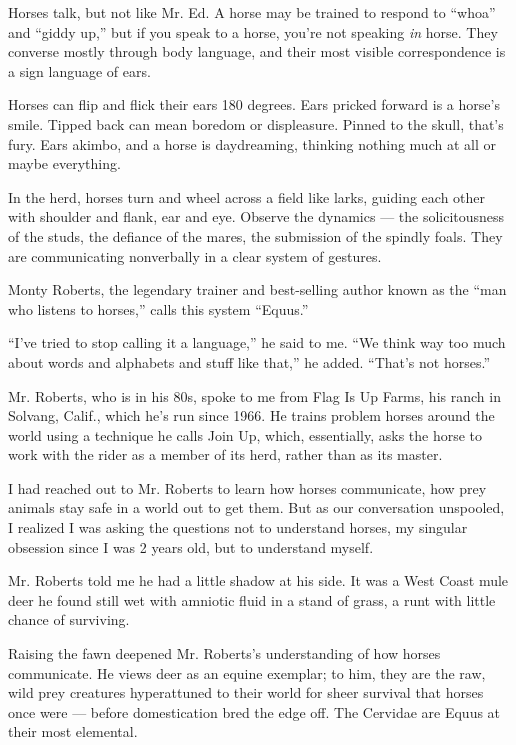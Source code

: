 Horses talk, but not like Mr. Ed. A horse may be trained to respond to
``whoa'' and ``giddy up,'' but if you speak to a horse, you're not
speaking \emph{in} horse. They converse mostly through body language,
and their most visible correspondence is a sign language of ears.

Horses can flip and flick their ears 180 degrees. Ears pricked forward
is a horse's smile. Tipped back can mean boredom or displeasure. Pinned
to the skull, that's fury. Ears akimbo, and a horse is daydreaming,
thinking nothing much at all or maybe everything.

In the herd, horses turn and wheel across a field like larks, guiding
each other with shoulder and flank, ear and eye. Observe the dynamics
--- the solicitousness of the studs, the defiance of the mares, the
submission of the spindly foals. They are communicating nonverbally in a
clear system of gestures.

Monty Roberts, the legendary trainer and best-selling author known as
the ``man who listens to horses,'' calls this system ``Equus.''

``I've tried to stop calling it a language,'' he said to me. ``We think
way too much about words and alphabets and stuff like that,'' he added.
``That's not horses.''

Mr. Roberts, who is in his 80s, spoke to me from Flag Is Up Farms, his
ranch in Solvang, Calif., which he's run since 1966. He trains problem
horses around the world using a technique he calls Join Up, which,
essentially, asks the horse to work with the rider as a member of its
herd, rather than as its master.

I had reached out to Mr. Roberts to learn how horses communicate, how
prey animals stay safe in a world out to get them. But as our
conversation unspooled, I realized I was asking the questions not to
understand horses, my singular obsession since I was 2 years old, but to
understand myself.

Mr. Roberts told me he had a little shadow at his side. It was a West
Coast mule deer he found still wet with amniotic fluid in a stand of
grass, a runt with little chance of surviving.

Raising the fawn deepened Mr. Roberts's understanding of how horses
communicate. He views deer as an equine exemplar; to him, they are the
raw, wild prey creatures hyperattuned to their world for sheer survival
that horses once were --- before domestication bred the edge off. The
Cervidae are Equus at their most elemental.

